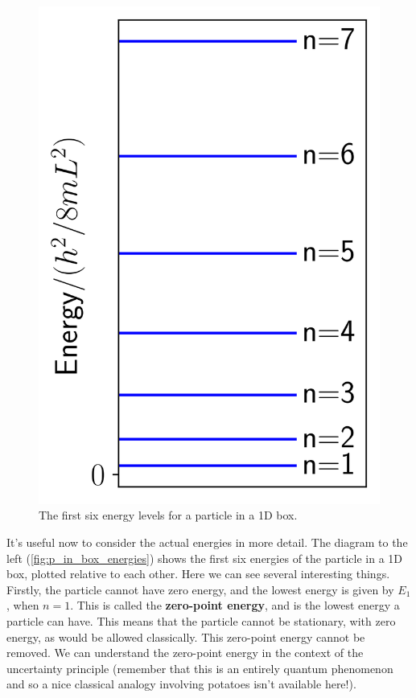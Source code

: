 \documentclass{memoir}[11pt,oneside,a4paper,openany]
\begin{document}
\begin{figure}
	\includegraphics[width=\linewidth]{particle_in_box_energies.png}
	\caption{The first six energy levels for a particle in a 1D box.}\label{fig:p_in_box_energies}
\end{figure}
It's useful now to consider the actual energies in more detail. The diagram to the left (\autoref{fig:p_in_box_energies}) shows the first six energies of the particle in a 1D box, plotted relative to each other. Here we can see several interesting things. Firstly, the particle cannot have zero energy, and the lowest energy is given by $E_1$, when $n=1$. This is called the \textbf{zero-point energy}, and is the lowest energy a particle can have. This means that the particle cannot be stationary, with zero energy, as would be allowed classically. This zero-point energy cannot be removed. We can understand the zero-point energy in the context of the uncertainty principle (remember that this is an entirely quantum phenomenon and so a nice classical analogy involving potatoes isn't available here!). 
\end{document}

